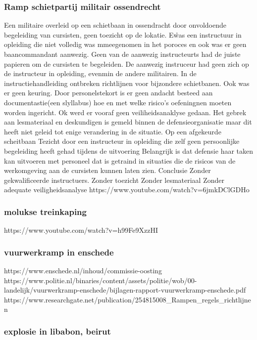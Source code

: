 \subsubsection{Ramp schietpartij militair ossendrecht }
Een militaire overleid op een schietbaan in ossendracht door onvoldoende begeleiding van cursisten, geen toezicht op de lokatie. E\r was een instructuur in opleiding die niet volledig was mmeegenomen in het poroces en ook was er geen baancommandant aanwezig. Geen van de aanwezig instructeurts had de juiste papieren om de cursisten te begeleiden. De aanwezig instruceur had geen zich op de instructeur in opleiding, evenmin de andere militairen. In de instructiehandleiding ontbreken richtlijnen voor bijzondere schietbanen. Ook was er geen keuring. Door personelstekort is er geen andacht besteed aan documentastie(een slyllabus) hoe en met welke risico’s oefeningnen moeten worden ingericht. Ok werd er vooraf geen veiliheidsanaklyse gedaan. Het gebrek aan lesmateriaal en deskundigen is gemeld binnen de defensieorganisatie maar dit heeft niet geleid tot enige verandering in de situatie.
Op een afgekeurde scheitbaan
Tezicht door een instructeur in opleiding die zelf geen persoonlijke begeleiding heeft gehad tijdens de uitvoering
Belangrijk is dat defensie haar taken kan uitvoeren met personeel dat is getraind in situaties die de risicos van de werkomgeving aan de cursisten kunnen laten zien.
Conclusie
Zonder gekwalificeerde instructuers.
Zonder toezicht
Zonder lesmateriaal
Zonder adequate veiligheidsanalyse
https://www.youtube.com/watch?v=6jmkDClGDHo 


\subsubsection{molukse treinkaping }
https://www.youtube.com/watch?v=h99Fe9XzzHI 

\subsubsection{vuurwerkramp in enschede }
https://www.enschede.nl/inhoud/commissie-oosting 
https://www.politie.nl/binaries/content/assets/politie/wob/00-landelijk/vuurwerkramp-enschede/bijlagen-rapport-vuurwerkramp-enschede.pdf 
https://www.researchgate.net/publication/254815008_Rampen_regels_richtlijnen 







\subsubsection{explosie in libabon, beirut 
}

